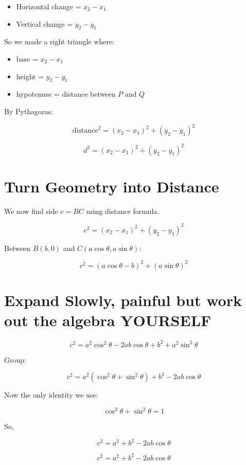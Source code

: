 \documentclass[11pt]{article}
\begin{document}
\begin{itemize}
\item Horizontal change = $x_2 - x_1$
\item Vertical change = $y_2 - y_1$
\end{itemize}

So we made a right triangle where:
\begin{itemize}
\item base = $x_2 - x_1$
\item height = $y_2 - y_1$
\item hypotenuse = distance between $P$ and $Q$
\end{itemize}

By Pythagoras:

\[
\text{distance}^2 = (x_2 - x_1)^2 + (y_2 - y_1)^2
\]

\begin{tcolorbox}[colback=soft, colframe=accent]
\[
\boxed{d^2 = (x_2 - x_1)^2 + (y_2 - y_1)^2}
\]
\end{tcolorbox}

\section*{\textcolor{main}{Turn Geometry into Distance}}

We now find side $c = BC$ using distance formula.

\[
c^2 = (x_2 - x_1)^2 + (y_2 - y_1)^2
\]

Between $B(b,0)$ and $C(a\cos\theta, a\sin\theta)$:

\[
c^2 = (a\cos\theta - b)^2 + (a\sin\theta)^2
\]

\section*{\textcolor{main}{Expand Slowly, painful but work out the algebra YOURSELF}}

\[
c^2 = a^2\cos^2\theta - 2ab\cos\theta + b^2 + a^2\sin^2\theta
\]

Group:

\[
c^2 = a^2(\cos^2\theta + \sin^2\theta) + b^2 - 2ab\cos\theta
\]

Now the only identity we use:

\[
\cos^2\theta + \sin^2\theta = 1
\]

So,

\[
c^2 = a^2 + b^2 - 2ab\cos\theta
\]

\begin{tcolorbox}[colback=soft, colframe=main]
\[
\boxed{c^2 = a^2 + b^2 - 2ab\cos\theta}
\]
\end{tcolorbox}
\end{document}

